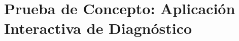 \chapter{Prueba de Concepto: Aplicación Interactiva de Diagnóstico}\label{ch:prueba_concepto}
    
    
    
    
    